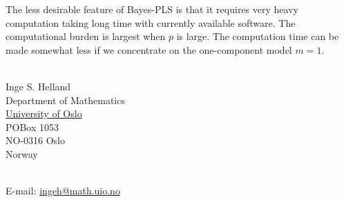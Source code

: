\documentclass[a4paper, 11pt]{article}
\begin{document}
The less desirable feature of Bayes-PLS is that it requires very heavy computation taking long time with currently available software. The computational burden is largest when $p$ is large. The computation time can be made somewhat  less if we concentrate on the one-component model $m=1$.



\bigskip

\ \\
Inge S. Helland \\
Department of Mathematics \\
\href{http://uio.no}{University of Oslo} \\
POBox 1053 \\
NO-0316 Oslo \\
Norway

\ \\
E-mail: \href{mailto:ingeh@math.uio.no}{ingeh@math.uio.no}
\end{document}
